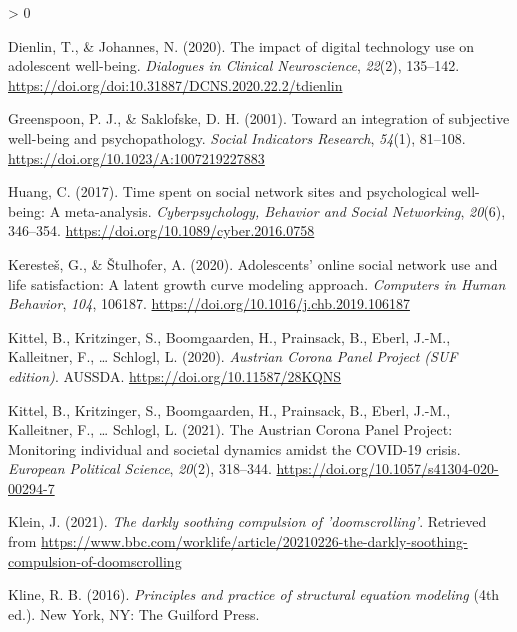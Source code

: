 \documentclass[
  english,
  man,floatsintext]{apa6}
\newlength{\cslhangindent}
\newenvironment{CSLReferences}[2] %
 {%
  \setlength{\parindent}{0pt}
  \ifodd #1 \everypar{\setlength{\hangindent}{\cslhangindent}}\ignorespaces\fi
  \ifnum #2 > 0
  \setlength{\parskip}{#2\baselineskip}
  \fi
 }%
 {}
\begin{document}
\begin{CSLReferences}{1}{0}
\leavevmode\hypertarget{ref-dienlinImpactDigitalTechnology2020}{}%
Dienlin, T., \& Johannes, N. (2020). The impact of digital technology use on adolescent well-being. \emph{Dialogues in Clinical Neuroscience}, \emph{22}(2), 135--142. \url{https://doi.org/doi:10.31887/DCNS.2020.22.2/tdienlin}

\leavevmode\hypertarget{ref-greenspoonIntegrationSubjectiveWellbeing2001}{}%
Greenspoon, P. J., \& Saklofske, D. H. (2001). Toward an integration of subjective well-being and psychopathology. \emph{Social Indicators Research}, \emph{54}(1), 81--108. \url{https://doi.org/10.1023/A:1007219227883}

\leavevmode\hypertarget{ref-huangTimeSpentSocial2017}{}%
Huang, C. (2017). Time spent on social network sites and psychological well-being: {A} meta-analysis. \emph{Cyberpsychology, Behavior and Social Networking}, \emph{20}(6), 346--354. \url{https://doi.org/10.1089/cyber.2016.0758}

\leavevmode\hypertarget{ref-kerestesAdolescentsOnlineSocial2020}{}%
Keresteš, G., \& Štulhofer, A. (2020). Adolescents' online social network use and life satisfaction: {A} latent growth curve modeling approach. \emph{Computers in Human Behavior}, \emph{104}, 106187. \url{https://doi.org/10.1016/j.chb.2019.106187}

\leavevmode\hypertarget{ref-kittelAustrianCoronaPanel2020}{}%
Kittel, B., Kritzinger, S., Boomgaarden, H., Prainsack, B., Eberl, J.-M., Kalleitner, F., \ldots{} Schlogl, L. (2020). \emph{Austrian {Corona} {Panel} {Project} ({SUF} edition)}. AUSSDA. \url{https://doi.org/10.11587/28KQNS}

\leavevmode\hypertarget{ref-kittelAustrianCoronaPanel2021}{}%
Kittel, B., Kritzinger, S., Boomgaarden, H., Prainsack, B., Eberl, J.-M., Kalleitner, F., \ldots{} Schlogl, L. (2021). The {Austrian} {Corona} {Panel} {Project}: Monitoring individual and societal dynamics amidst the {COVID}-19 crisis. \emph{European Political Science}, \emph{20}(2), 318--344. \url{https://doi.org/10.1057/s41304-020-00294-7}

\leavevmode\hypertarget{ref-kleinDarklySoothingCompulsion2021}{}%
Klein, J. (2021). \emph{The darkly soothing compulsion of 'doomscrolling'}. Retrieved from \url{https://www.bbc.com/worklife/article/20210226-the-darkly-soothing-compulsion-of-doomscrolling}

\leavevmode\hypertarget{ref-klinePrinciplesPracticeStructural2016}{}%
Kline, R. B. (2016). \emph{Principles and practice of structural equation modeling} (4th ed.). New York, NY: The Guilford Press.


\end{CSLReferences}
\end{document}
